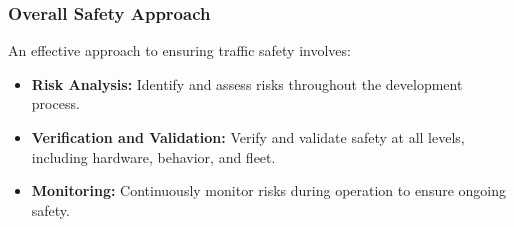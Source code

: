 \subsubsection*{Overall Safety Approach}
An effective approach to ensuring traffic safety involves:
\begin{itemize}
    \item \textbf{Risk Analysis:} Identify and assess risks throughout the development process.
    \item \textbf{Verification and Validation:} Verify and validate safety at all levels, including hardware, behavior, and fleet.
    \item \textbf{Monitoring:} Continuously monitor risks during operation to ensure ongoing safety.
\end{itemize}